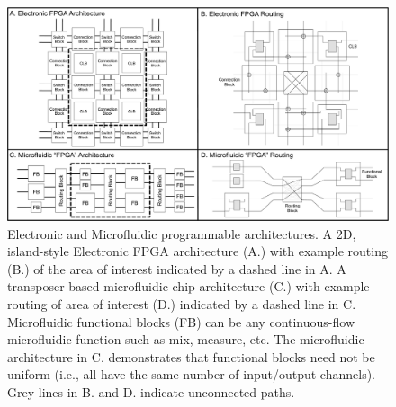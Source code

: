 \begin{figure}[h]
  \begin{minipage}[t]{0.99\linewidth}\centering
    \includegraphics[width=15cm]{fig9.pdf}
    \medskip
  \end{minipage}\hfill
  \caption[Electronic and Microfludic programmable architectures]{Electronic and Microfluidic programmable architectures. A 2D, island-style Electronic FPGA architecture (A.) with example routing (B.) of the area of interest indicated by a dashed line in A. A transposer-based microfluidic chip architecture (C.) with example routing of area of interest (D.) indicated by a dashed line in C. Microfluidic functional blocks (FB) can be any continuous-flow microfluidic function such as mix, measure, etc. The microfluidic architecture in C. demonstrates that functional blocks need not be uniform (i.e., all have the same number of input/output channels). Grey lines in B. and D. indicate unconnected paths.}
	\label{fig:fpgaArchAndRouting}
\end{figure}
